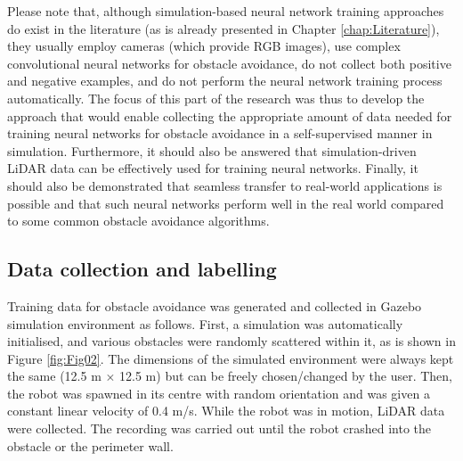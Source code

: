 Please note that, although simulation-based neural network training approaches do exist in the literature (as is already presented in Chapter \ref{chap:Literature}), they usually employ cameras (which provide RGB images), use complex convolutional neural networks for obstacle avoidance, do not collect both positive and negative examples, and do not perform the neural network training process automatically. The focus of this part of the research was thus to develop the approach that would enable collecting the appropriate amount of data needed for training neural networks for obstacle avoidance in a self-supervised manner in simulation. Furthermore, it should also be answered that simulation-driven LiDAR data can be effectively used for training neural networks. Finally, it should also be demonstrated that seamless transfer to real-world applications is possible and that such neural networks perform well in the real world compared to some common obstacle avoidance algorithms.

\subsection{Data collection and labelling}

Training data for obstacle avoidance was generated and collected in Gazebo simulation environment \cite{Koenig2004} as follows. First, a simulation was automatically initialised, and various obstacles were randomly scattered within it, as is shown in Figure \ref{fig:Fig02}. The dimensions of the simulated environment were always kept the same (12.5 m $\times$ 12.5 m) but can be freely chosen/changed by the user. Then, the robot was spawned in its centre with random orientation and was given a constant linear velocity of 0.4 m/s. While the robot was in motion, LiDAR data were collected. The recording was carried out until the robot crashed into the obstacle or the perimeter wall.

